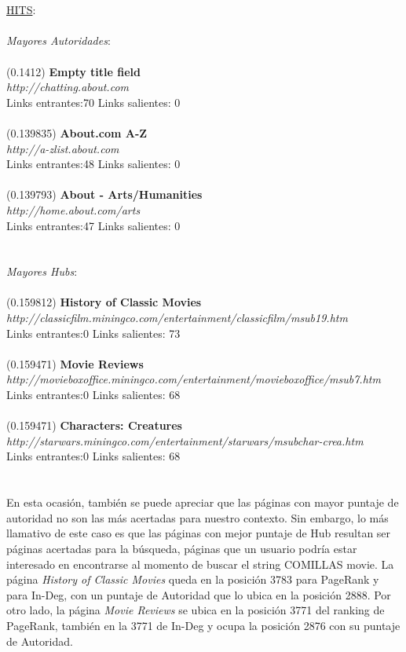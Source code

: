 \documentclass[a4paper]{article}
\begin{document}
\\
\\
\underline{HITS}: \\
\\
\emph{Mayores Autoridades}: \\
\\
(0.1412) \textbf{Empty title field} \\
\textit{http://chatting.about.com} \\
Links entrantes:70 \indent Links salientes: 0\\
\\
(0.139835)\textbf{ About.com A-Z} \\
\textit{http://a-zlist.about.com} \\
Links entrantes:48 \indent Links salientes: 0\\
\\
(0.139793) \textbf{About - Arts/Humanities} \\
\textit{http://home.about.com/arts} \\
Links entrantes:47 \indent Links salientes: 0\\
\\
\\
\emph{Mayores Hubs}: \\
\\
(0.159812) \textbf{History of Classic Movies} \\
\textit{http://classicfilm.miningco.com/entertainment/classicfilm/msub19.htm} \\
Links entrantes:0 \indent Links salientes: 73\\
\\
(0.159471)\textbf{ Movie Reviews} \\
\textit{http://movieboxoffice.miningco.com/entertainment/movieboxoffice/msub7.htm} \\
Links entrantes:0 \indent Links salientes: 68\\
\\
(0.159471) \textbf{Characters: Creatures} \\
\textit{http://starwars.miningco.com/entertainment/starwars/msubchar-crea.htm }\\
Links entrantes:0 \indent Links salientes: 68\\
\\
\\
\indent En esta ocasi\'on, tambi\'en se puede apreciar que las p\'aginas con mayor puntaje de autoridad no son las m\'as acertadas para nuestro contexto. Sin embargo, lo m\'as llamativo de este caso es que las p\'aginas con mejor puntaje de Hub resultan ser p\'aginas acertadas para la b\'usqueda, p\'aginas que un usuario podr\'ia estar interesado en encontrarse al momento de buscar el string COMILLAS movie. La p\'agina \emph{History of Classic Movies} queda en la posici\'on 3783 para PageRank y para In-Deg, con un puntaje de Autoridad que lo ubica en la posici\'on 2888. Por otro lado, la p\'agina \emph{Movie Reviews} se ubica en la posici\'on 3771 del ranking de PageRank, tambi\'en en la 3771 de In-Deg y ocupa la posici\'on 2876 con su puntaje de Autoridad.\\
\end{document}

